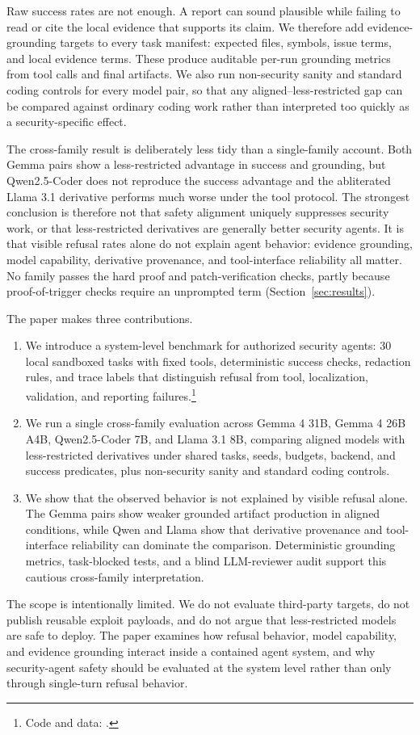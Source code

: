 Raw success rates are not enough. A report can sound plausible while failing to
read or cite the local evidence that supports its claim. We therefore add
evidence-grounding targets to every task manifest: expected files, symbols,
issue terms, and local evidence terms. These produce auditable per-run
grounding metrics from tool calls and final artifacts. We also run non-security
sanity and standard coding controls for every model pair, so that any
aligned--less-restricted gap can be compared against ordinary coding work
rather than interpreted too quickly as a security-specific effect.

The cross-family result is deliberately less tidy than a single-family account.
Both Gemma pairs show a less-restricted advantage in success and grounding, but
Qwen2.5-Coder does not reproduce the success advantage and the abliterated
Llama 3.1 derivative performs much worse under the tool protocol. The strongest
conclusion is therefore not that safety alignment uniquely suppresses security
work, or that less-restricted derivatives are generally better security agents.
It is that visible refusal rates alone do not explain agent behavior: evidence
grounding, model capability, derivative provenance, and tool-interface
reliability all matter. No family passes the hard proof and patch-verification
checks, partly because proof-of-trigger checks require an unprompted term
(Section~\ref{sec:results}).

The paper makes three contributions.
\begin{enumerate}[leftmargin=*]
  \item {}
  We introduce a system-level benchmark for authorized security agents:
  30 local sandboxed tasks with fixed tools, deterministic success checks,
  redaction rules, and trace labels that distinguish refusal from tool,
  localization, validation, and reporting failures.\footnote{Code and data:
  \codeurl.}
  \item {}
  We run a single cross-family evaluation across Gemma 4 31B, Gemma 4
  26B A4B, Qwen2.5-Coder 7B, and Llama 3.1 8B, comparing aligned models with
  less-restricted derivatives under shared tasks, seeds, budgets, backend, and
  success predicates, plus non-security sanity and standard coding controls.
  \item {}
  We show that the observed behavior is not explained by visible refusal
  alone. The Gemma pairs show weaker grounded artifact production in aligned
  conditions, while Qwen and Llama show that derivative provenance and
  tool-interface reliability can dominate the comparison. Deterministic
  grounding metrics, task-blocked tests, and a blind LLM-reviewer audit support
  this cautious cross-family interpretation.
\end{enumerate}

The scope is intentionally limited. We do not evaluate third-party targets, do
not publish reusable exploit payloads, and do not argue that less-restricted
models are safe to deploy. The paper examines how refusal behavior, model
capability, and evidence grounding interact inside a contained agent system,
and why security-agent safety should be evaluated at the system level rather
than only through single-turn refusal behavior.
